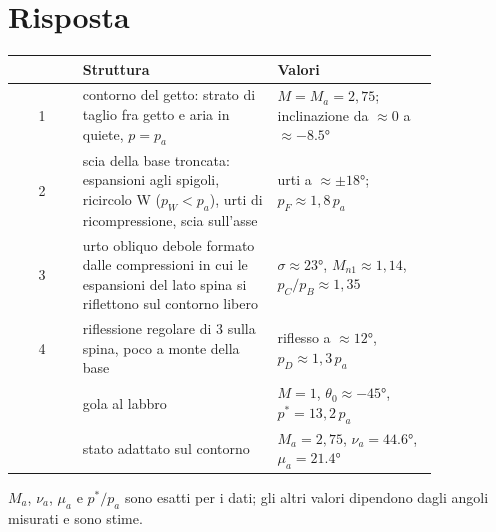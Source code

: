 \section*{Risposta}
\begin{table}[H]
\centering\small
\begin{tabular}{cp{0.46\linewidth}p{0.38\linewidth}}
\toprule
& Struttura & Valori \\
\midrule
1 & contorno del getto: strato di taglio fra getto e aria in quiete, $p=p_a$ & $M=M_a=2{,}75$; inclinazione da
$\approx0$ a $\approx\ang{-8.5}$ \\
2 & scia della base troncata: espansioni agli spigoli, ricircolo W ($p_W<p_a$), urti di ricompressione, scia
sull'asse & urti a $\approx\pm\ang{18}$; $p_F\approx1{,}8\,p_a$ \\
3 & urto obliquo debole formato dalle compressioni in cui le espansioni del lato spina si riflettono sul contorno
libero & $\sigma\approx\ang{23}$, $M_{n1}\approx1{,}14$, $p_C/p_B\approx1{,}35$ \\
4 & riflessione regolare di 3 sulla spina, poco a monte della base & riflesso a $\approx\ang{12}$, $p_D\approx1{,}3\,p_a$ \\
\midrule
& gola al labbro & $M=1$, $\theta_0\approx\ang{-45}$, $p^*=13{,}2\,p_a$ \\
& stato adattato sul contorno & $M_a=2{,}75$, $\nu_a=\ang{44.6}$, $\mu_a=\ang{21.4}$ \\
\bottomrule
\end{tabular}
\end{table}
$M_a$, $\nu_a$, $\mu_a$ e $p^*/p_a$ sono esatti per i dati; gli altri valori dipendono dagli angoli misurati e sono
stime.

